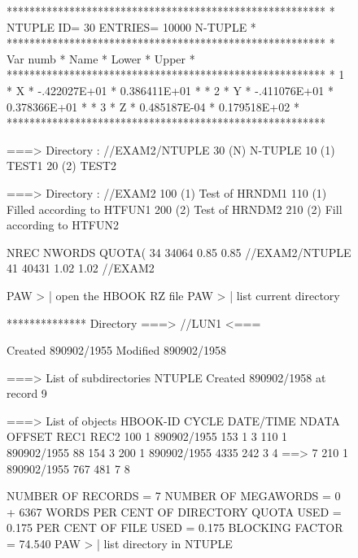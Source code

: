 \begin{figure}[p]
\begin{minipage}[t]{.49\linewidth}
\begin{talltt}
********************************************************
* NTUPLE ID=   30  ENTRIES=  10000   N-TUPLE           *
********************************************************
*  Var numb  *   Name    *    Lower     *    Upper     *
********************************************************
*      1     *    X      * -.422027E+01 * 0.386411E+01 *
*      2     *    Y      * -.411076E+01 * 0.378366E+01 *
*      3     *    Z      * 0.485187E-04 * 0.179518E+02 *
********************************************************
 
 
===> Directory : //EXAM2/NTUPLE
        30 (N)   N-TUPLE
        10 (1)   TEST1
        20 (2)   TEST2
 
===> Directory : //EXAM2
       100 (1)   Test of HRNDM1
       110 (1)   Filled according to HTFUN1
       200 (2)   Test of HRNDM2
       210 (2)   Fill according to HTFUN2
 
 
     NREC    NWORDS    QUOTA(%
      34      34064      0.85     0.85   //EXAM2/NTUPLE
      41      40431      1.02     1.02   //EXAM2
 
\end{talltt}
\end{minipage}\hfill
\begin{minipage}[t]{.49\linewidth}
\begin{talltt}
 PAW >     | open the HBOOK RZ file
 PAW >                         | list current directory
 
 ************** Directory ===> //LUN1 <===
 
                  Created 890902/1955  Modified 890902/1958
 
 ===> List of subdirectories
 NTUPLE           Created 890902/1958 at record     9
 
 ===> List of objects
     HBOOK-ID  CYCLE   DATE/TIME   NDATA   OFFSET    REC1    REC2
        100       1   890902/1955    153       1       3
        110       1   890902/1955     88     154       3
        200       1   890902/1955   4335     242       3       4 ==>     7
        210       1   890902/1955    767     481       7       8
 
  NUMBER OF RECORDS =    7  NUMBER OF MEGAWORDS =  0 +  6367 WORDS
  PER CENT OF DIRECTORY QUOTA USED =   0.175
  PER CENT OF FILE USED            =   0.175
  BLOCKING FACTOR                  =  74.540
 PAW >                | list directory in NTUPLE
 

\end{talltt}
\end{minipage}
\end{figure}
